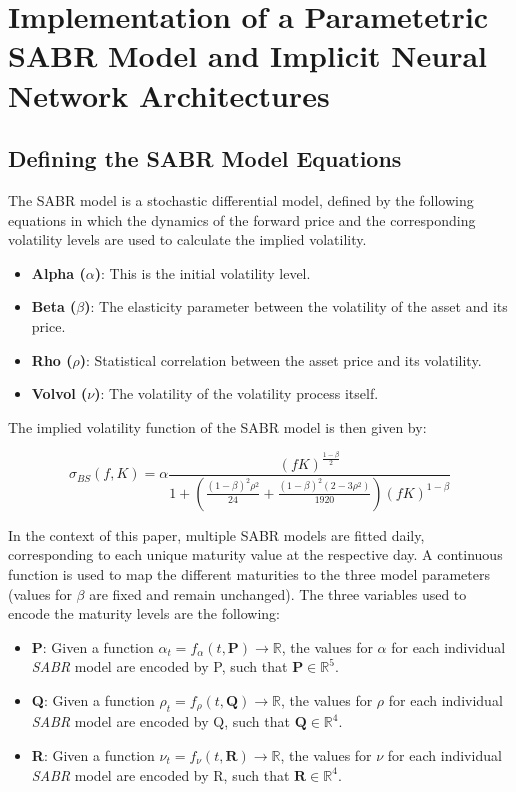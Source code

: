 \section{Implementation of a Parametetric SABR Model and Implicit Neural Network Architectures}
\subsection{Defining the SABR Model Equations}

The SABR model is a stochastic differential model, defined by the following equations in which the dynamics of the forward price and the corresponding volatility levels are used to calculate the implied volatility.
\begin{itemize}
	\item \textbf{Alpha (\(\alpha\))}: This is the initial volatility level.
	\item \textbf{Beta (\(\beta\))}: The elasticity parameter between the volatility of the asset and its price.
	\item \textbf{Rho (\(\rho\))}: Statistical correlation between the asset price and its volatility.
	\item \textbf{Volvol (\(\nu\))}: The volatility of the volatility process itself.
\end{itemize}

The implied volatility function of the SABR model is then given by:

\begin{equation}
	\sigma_{\textit{BS}}(f, K) = 
	\alpha \frac{(fK)^{\frac{1 - \beta}{2}}}{1 + \left(\frac{(1 - \beta)^2 \rho^2}{24} + \frac{(1 - \beta)^2(2 - 3\rho^2)}{1920} \right) (fK)^{1 - \beta}}
\end{equation}

In the context of this paper, multiple SABR models are fitted daily, corresponding to each unique maturity value at the respective day. A continuous function is used to map the different maturities to the three model parameters (values for $\beta$ are fixed and remain unchanged). The three variables used to encode the maturity levels are the following:

\begin{itemize}
	\item \textbf{P}: Given a function $\alpha_t = f_{\alpha}(t, \textbf{P}) \rightarrow \mathbb{R}$, the values for $\alpha$ for each individual \textit{SABR} model are encoded by P, such that $\textbf{P} \in \mathbb{R}^{5}$.
	
	\item \textbf{Q}: Given a function $\rho_t = f_{\rho}(t, \textbf{Q}) \rightarrow \mathbb{R}$, the values for $\rho$ for each individual \textit{SABR} model are encoded by Q, such that $\textbf{Q} \in \mathbb{R}^{4}$.
	
	\item \textbf{R}: Given a function $\nu_t = f_{\nu}(t, \textbf{R}) \rightarrow \mathbb{R}$, the values for $\nu$ for each individual \textit{SABR} model are encoded by R, such that $\textbf{R} \in \mathbb{R}^{4}$.
\end{itemize}

